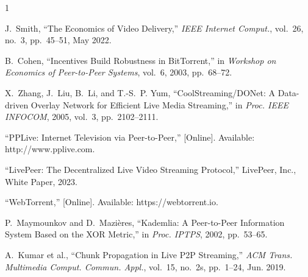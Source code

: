 \documentclass[journal]{IEEEtran}
\begin{document}
\begin{thebibliography}{1}

J.~Smith, ``The Economics of Video Delivery,'' {\em IEEE Internet Comput.}, vol.~26, no.~3, pp.~45--51, May 2022.

B.~Cohen, ``Incentives Build Robustness in BitTorrent,'' in {\em Workshop on Economics of Peer-to-Peer Systems}, vol.~6, 2003, pp.~68--72.

X.~Zhang, J.~Liu, B.~Li, and T.-S.~P. Yum, ``CoolStreaming/DONet: A Data-driven Overlay Network for Efficient Live Media Streaming,'' in {\em Proc. IEEE INFOCOM}, 2005, vol.~3, pp.~2102--2111.

``PPLive: Internet Television via Peer-to-Peer,'' [Online]. Available: http://www.pplive.com.

``LivePeer: The Decentralized Live Video Streaming Protocol,'' LivePeer, Inc., White Paper, 2023.

``WebTorrent,'' [Online]. Available: https://webtorrent.io.

P.~Maymounkov and D.~Mazières, ``Kademlia: A Peer-to-Peer Information System Based on the XOR Metric,'' in {\em Proc. IPTPS}, 2002, pp.~53--65.

A.~Kumar et al., ``Chunk Propagation in Live P2P Streaming,'' {\em ACM Trans. Multimedia Comput. Commun. Appl.}, vol.~15, no.~2s, pp.~1--24, Jun. 2019.

\end{thebibliography}
\end{document}
